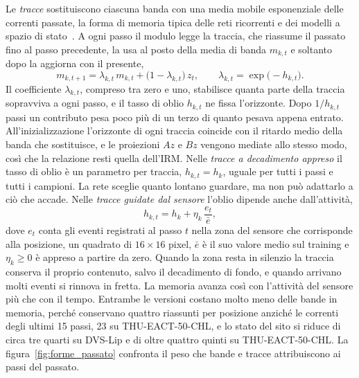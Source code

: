 Le \emph{tracce} sostituiscono ciascuna banda con una media mobile esponenziale delle correnti passate, la forma di memoria tipica delle reti ricorrenti e dei modelli a spazio di stato~\cite{gu2023mamba}. A ogni passo il modulo legge la traccia, che riassume il passato fino al passo precedente, la usa al posto della media di banda $m_{k,t}$ e soltanto dopo la aggiorna con il presente,
\begin{equation}
\label{eq:traccia}
m_{k,t+1}=\lambda_{k,t}\,m_{k,t}+\bigl(1-\lambda_{k,t}\bigr)\,z_t,
\qquad
\lambda_{k,t}=\exp\bigl(-h_{k,t}\bigr).
\end{equation}
Il coefficiente $\lambda_{k,t}$, compreso tra zero e uno, stabilisce quanta parte della traccia sopravviva a ogni passo, e il tasso di oblio $h_{k,t}$ ne fissa l'orizzonte. Dopo $1/h_{k,t}$ passi un contributo pesa poco più di un terzo di quanto pesava appena entrato. All'inizializzazione l'orizzonte di ogni traccia coincide con il ritardo medio della banda che sostituisce, e le proiezioni $Az$ e $Bz$ vengono mediate allo stesso modo, così che la relazione resti quella dell'IRM. Nelle \emph{tracce a decadimento appreso} il tasso di oblio è un parametro per traccia, $h_{k,t}=h_k$, uguale per tutti i passi e tutti i campioni. La rete sceglie quanto lontano guardare, ma non può adattarlo a ciò che accade. Nelle \emph{tracce guidate dal sensore} l'oblio dipende anche dall'attività,
\begin{equation}
\label{eq:traccia_eventi}
h_{k,t}=h_k+\eta_k\,\frac{e_t}{\bar e},
\end{equation}
dove $e_t$ conta gli eventi registrati al passo $t$ nella zona del sensore che corrisponde alla posizione, un quadrato di $16\times16$ pixel, $\bar e$ è il suo valore medio sul training e $\eta_k\ge0$ è appreso a partire da zero. Quando la zona resta in silenzio la traccia conserva il proprio contenuto, salvo il decadimento di fondo, e quando arrivano molti eventi si rinnova in fretta. La memoria avanza così con l'attività del sensore più che con il tempo. Entrambe le versioni costano molto meno delle bande in memoria, perché conservano quattro riassunti per posizione anziché le correnti degli ultimi 15 passi, 23 su THU-EACT-50-CHL, e lo stato del sito si riduce di circa tre quarti su DVS-Lip e di oltre quattro quinti su THU-EACT-50-CHL. La figura~\ref{fig:forme_passato} confronta il peso che bande e tracce attribuiscono ai passi del passato.


